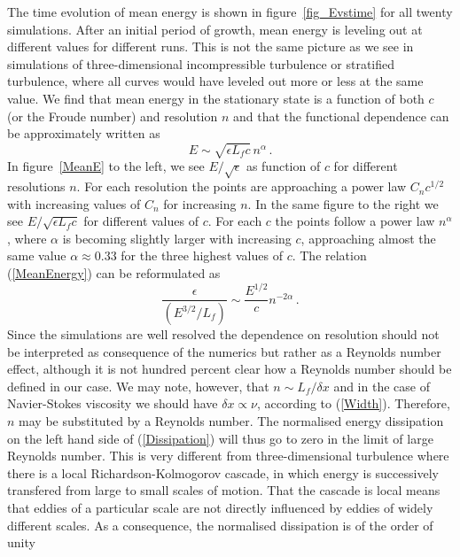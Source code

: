 The time evolution of mean energy is shown in figure~\ref{fig_Evstime} for all
twenty simulations. After an initial period of growth, mean energy is leveling
out at different values for different runs. This is not the same picture as we
see in simulations of three-dimensional incompressible turbulence or stratified
turbulence, where all curves would have leveled out more or less at the same
value. We find that mean energy in the stationary state is a function of both $
c $ (or the Froude number) and resolution $ n $ and that the functional
dependence can be approximately written as
\begin{equation} \label{MeanEnergy}
E \sim \sqrt{\epsilon L_f c } \, n^{\alpha}  \, .
\end{equation}
 In figure~\ref{MeanE} to the
left, we see $ E/\sqrt{\epsilon} $ as function of $ c $ for different resolutions $
n $. For each resolution the points are approaching a power law $ C_n c^{1/2} $
with increasing values of $ C_n $ for increasing $ n $. In the same figure to
the right we see $ E/\sqrt{\epsilon L_f c } $ for different values of $ c $. For
each $ c $ the points follow a power law $ n^{\alpha} $, where $ \alpha $ is
becoming slightly larger with increasing $ c $, approaching almost the same
value $ \alpha \approx 0.33 $ for the three highest values of $ c $. The
relation (\ref{MeanEnergy}) can be reformulated as
\begin{equation} \label{Dissipation}
\frac{\epsilon} {(E^{3/2} / L_f)} \sim \frac{E^{1/2}}{c} n^{-2\alpha} \, .
\end{equation}
Since the simulations are well resolved the dependence on resolution should not
be interpreted as consequence of the numerics but rather as a Reynolds number
effect, although it is not hundred percent clear how a Reynolds number should
be defined in our case. We may note, however, that $ n \sim L_f/\delta x $ and in the case of Navier-Stokes viscosity
 we should have $ \delta x \propto \nu $, according to (\ref{Width}). Therefore,  $ n $ may be substituted by a Reynolds number. The normalised energy dissipation on the left hand side of
(\ref{Dissipation}) will thus go to zero in the limit of large Reynolds number.
This is very different from three-dimensional turbulence where there is a local
Richardson-Kolmogorov cascade, in which energy is successively transfered from
large to small scales of motion. That the cascade is local means that eddies of
a particular scale are not directly influenced by eddies of widely different
scales. As a consequence, the normalised dissipation is of the order of unity
